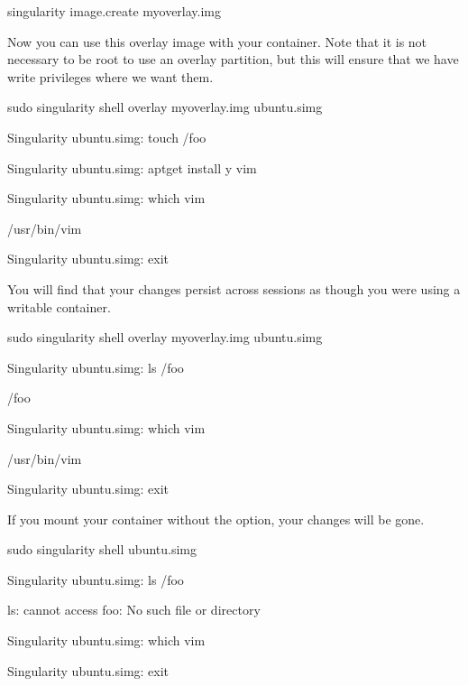 \documentclass[letterpaper,10pt,english]{sphinxmanual}
\begin{document}
%
\begin{sphinxVerbatim}[commandchars=\\\{\}]
\PYGZdl{} singularity image.create my\PYGZhy{}overlay.img
\end{sphinxVerbatim}

Now you can use this overlay image with your container. Note that it is
not necessary to be root to use an overlay partition, but this will
ensure that we have write privileges where we want them.

%
\begin{sphinxVerbatim}[commandchars=\\\{\}]
\PYGZdl{} sudo singularity shell \PYGZhy{}\PYGZhy{}overlay my\PYGZhy{}overlay.img ubuntu.simg

Singularity ubuntu.simg:\PYGZti{}\PYGZgt{} touch /foo

Singularity ubuntu.simg:\PYGZti{}\PYGZgt{} apt\PYGZhy{}get install \PYGZhy{}y vim

Singularity ubuntu.simg:\PYGZti{}\PYGZgt{} which vim

/usr/bin/vim

Singularity ubuntu.simg:\PYGZti{}\PYGZgt{} exit
\end{sphinxVerbatim}

You will find that your changes persist across sessions as though you
were using a writable container.

%
\begin{sphinxVerbatim}[commandchars=\\\{\}]
\PYGZdl{} sudo singularity shell \PYGZhy{}\PYGZhy{}overlay my\PYGZhy{}overlay.img ubuntu.simg

Singularity ubuntu.simg:\PYGZti{}\PYGZgt{} ls /foo

/foo

Singularity ubuntu.simg:\PYGZti{}\PYGZgt{} which vim

/usr/bin/vim

Singularity ubuntu.simg:\PYGZti{}\PYGZgt{} exit
\end{sphinxVerbatim}

If you mount your container without the  option, your changes will be
gone.

%
\begin{sphinxVerbatim}[commandchars=\\\{\}]
\PYGZdl{} sudo singularity shell ubuntu.simg

Singularity ubuntu.simg:\PYGZti{}\PYGZgt{} ls /foo

ls: cannot access \PYGZsq{}foo\PYGZsq{}: No such file or directory

Singularity ubuntu.simg:\PYGZti{}\PYGZgt{} which vim

Singularity ubuntu.simg:\PYGZti{}\PYGZgt{} exit
\end{sphinxVerbatim}
\end{document}
